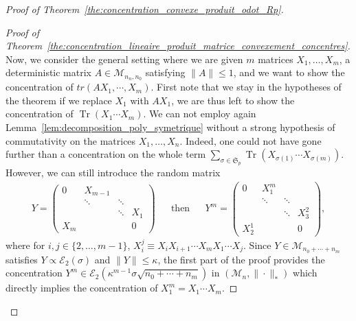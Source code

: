 \documentclass{ws-rmta}
\DeclareMathOperator{\tr}{Tr}
\begin{document}
\begin{proof}[Proof of Theorem~\ref{the:concentration_convexe_produit_odot_Rp}]
\begin{proof}[Proof of Theorem~\ref{the:concentration_lineaire_produit_matrice_convexement_concentres}]
  Now, we consider the general setting where we are given $m$ matrices $X_1,\ldots, X_m$, a deterministic matrix $A \in \mathcal{M}_{n_n,n_0}$ satisfying $\|A\|\leq 1$, and we want to show the concentration of $tr(AX_1,\cdots, X_m)$. First note that we stay in the hypotheses of the theorem if we replace $X_1$ with $AX_1$, we are thus left to show the concentration of $\tr(X_1 \cdots X_m)$.
  We can not employ again Lemma~\ref{lem:decomposition_poly_symetrique} without a strong hypothesis of commutativity on the matrices $X_1,\ldots, X_n$. Indeed, one could not have gone further than a concentration on the whole term $\sum_{\sigma \in \mathfrak S_p}\tr(X_{\sigma(1)} \cdots X_{\sigma(m)})$.
However, we can still introduce the random matrix
    \begin{align*}
    Y = \left( \begin{array}{cccc}
    0&X_{m-1} &&  \\
    & \ddots&\ddots& \\
    & &\ddots&X_1 \\
    X_m& &&0  \end{array} \right)&
    &\text{then}&
    &Y^m = \left( \begin{array}{cccc}
    0&X^{m}_1 &&  \\
    & \ddots&\ddots& \\
    & &\ddots&X_{3}^{2}\\
    X_{2}^{1}& &&0  \end{array} \right),
    \end{align*}
    where for $i,j \in \{2, \ldots, m-1\}$, $X^j_i \equiv X_i X_{i+1} \cdots X_m X_{1}\cdots X_j$. Since $Y \in \mathcal{M}_{n_0+\cdots+n_m}$ satisfies $Y \propto \mathcal E_2(\sigma)$ and $\|Y\|\leq \kappa$, the first part of the proof provides the concentration $Y^m \in \mathcal E_2 \left(\kappa^{m-1}\sigma\sqrt{n_0+\cdots+n_m}\right)$ in $\left(\mathcal M_n, \| \cdot \|_*\right)$ which directly implies the concentration of $X_1^m= X_1\cdots X_m$.


\end{proof}
\end{proof}
\end{document}
